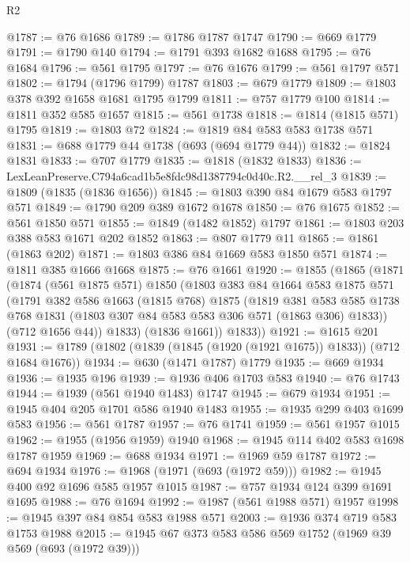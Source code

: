 \begin{lexlean}{R2}
\begin{coremodule}
@1787 := @76 @1686
@1789 := @1786 @1787 @1747
@1790 := @669 @1779
@1791 := @1790 @140
@1794 := @1791 @393 @1682 @1688
@1795 := @76 @1684
@1796 := @561 @1795
@1797 := @76 @1676
@1799 := @561 @1797 @571
@1802 := @1794 (@1796 @1799) @1787
@1803 := @679 @1779
@1809 := @1803 @378 @392 @1658 @1681 @1795 @1799
@1811 := @757 @1779 @100
@1814 := @1811 @352 @585 @1657
@1815 := @561 @1738
@1818 := @1814 (@1815 @571) @1795
@1819 := @1803 @72
@1824 := @1819 @84 @583 @583 @1738 @571
@1831 := @688 @1779 @44 @1738 (@693 (@694 @1779 @44))
@1832 := @1824 @1831
@1833 := @707 @1779
@1835 := @1818 (@1832 @1833)
@1836 := LexLeanPreserve.C794a6cad1b5e8fdc98d1387794c0d40c.R2.__rel_3
@1839 := @1809 (@1835 (@1836 @1656))
@1845 := @1803 @390 @84 @1679 @583 @1797 @571
@1849 := @1790 @209 @389 @1672 @1678
@1850 := @76 @1675
@1852 := @561 @1850 @571
@1855 := @1849 (@1482 @1852) @1797
@1861 := @1803 @203 @388 @583 @1671 @202 @1852
@1863 := @807 @1779 @11
@1865 := @1861 (@1863 @202)
@1871 := @1803 @386 @84 @1669 @583 @1850 @571
@1874 := @1811 @385 @1666 @1668
@1875 := @76 @1661
@1920 := @1855
    (@1865
      (@1871
        (@1874
          (@561 @1875 @571)
          @1850
          (@1803
            @383
            @84
            @1664
            @583
            @1875
            @571
            (@1791
              @382
              @586
              @1663
              (@1815 @768)
              @1875
              (@1819
                @381
                @583
                @585
                @1738
                @768
                @1831
                (@1803 @307 @84 @583 @583 @306 @571 (@1863 @306) @1833))
              (@712 @1656 @44))
            @1833)
          (@1836 @1661))
        @1833))
@1921 := @1615 @201
@1931 := @1789 (@1802 (@1839 (@1845 (@1920 (@1921 @1675)) @1833)) (@712 @1684 @1676))
@1934 := @630 (@1471 @1787) @1779
@1935 := @669 @1934
@1936 := @1935 @196
@1939 := @1936 @406 @1703 @583
@1940 := @76 @1743
@1944 := @1939 (@561 @1940 @1483) @1747
@1945 := @679 @1934
@1951 := @1945 @404 @205 @1701 @586 @1940 @1483
@1955 := @1935 @299 @403 @1699 @583
@1956 := @561 @1787
@1957 := @76 @1741
@1959 := @561 @1957 @1015
@1962 := @1955 (@1956 @1959) @1940
@1968 := @1945 @114 @402 @583 @1698 @1787 @1959
@1969 := @688 @1934
@1971 := @1969 @59 @1787
@1972 := @694 @1934
@1976 := @1968 (@1971 (@693 (@1972 @59)))
@1982 := @1945 @400 @92 @1696 @585 @1957 @1015
@1987 := @757 @1934 @124 @399 @1691 @1695
@1988 := @76 @1694
@1992 := @1987 (@561 @1988 @571) @1957
@1998 := @1945 @397 @84 @854 @583 @1988 @571
@2003 := @1936 @374 @719 @583 @1753 @1988
@2015 := @1945 @67 @373 @583 @586 @569 @1752 (@1969 @39 @569 (@693 (@1972 @39)))

\end{coremodule}
\end{lexlean}
